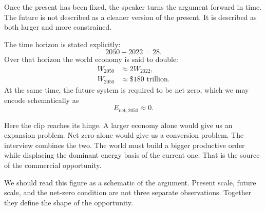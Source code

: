 Once the present has been fixed, the speaker turns the argument forward in time. The future is not described as a cleaner version of the present. It is described as both larger and more constrained.

The time horizon is stated explicitly:
\begin{equation}
2050 - 2022 = 28.
\end{equation}
Over that horizon the world economy is said to double:
\begin{align}
W_{2050} &\approx 2W_{2022},\\
W_{2050} &\approx \$180\text{ trillion}.
\end{align}
At the same time, the future system is required to be net zero, which we may encode schematically as
\begin{equation}
E_{\mathrm{net},2050} \approx 0.
\end{equation}

Here the clip reaches its hinge. A larger economy alone would give us an expansion problem. Net zero alone would give us a conversion problem. The interview combines the two. The world must build a bigger productive order while displacing the dominant energy basis of the current one. That is the source of the commercial opportunity.

\begin{figure}
\centering
{}
\end{figure}

We should read this figure as a schematic of the argument. Present scale, future scale, and the net-zero condition are not three separate observations. Together they define the shape of the opportunity.

